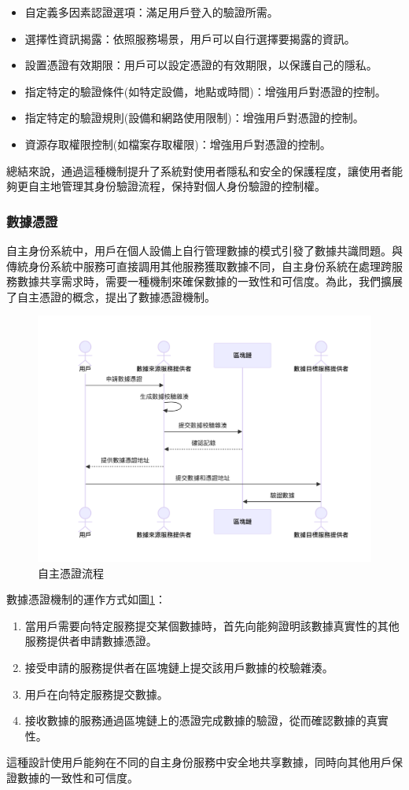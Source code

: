 \begin{itemize}
  \item 自定義多因素認證選項：滿足用戶登入的驗證所需。
  \item 選擇性資訊揭露：依照服務場景，用戶可以自行選擇要揭露的資訊。
  \item 設置憑證有效期限：用戶可以設定憑證的有效期限，以保護自己的隱私。
  \item 指定特定的驗證條件(如特定設備，地點或時間)：增強用戶對憑證的控制。
  \item 指定特定的驗證規則(設備和網路使用限制)：增強用戶對憑證的控制。
  \item 資源存取權限控制(如檔案存取權限)：增強用戶對憑證的控制。
\end{itemize}

總結來說，通過這種機制提升了系統對使用者隱私和安全的保護程度，讓使用者能夠更自主地管理其身份驗證流程，保持對個人身份驗證的控制權。
\subsubsection{數據憑證}
自主身份系統中，用戶在個人設備上自行管理數據的模式引發了數據共識問題。與傳統身份系統中服務可直接調用其他服務獲取數據不同，自主身份系統在處理跨服務數據共享需求時，需要一種機制來確保數據的一致性和可信度。為此，我們擴展了自主憑證的概念，提出了數據憑證機制。
\begin{figure}
  \centering
  \includegraphics[width=\linewidth,keepaspectratio]{figures/flow-dc.png}
  \caption{自主憑證流程}
  \label{fig:flow-dc}
\end{figure}
數據憑證機制的運作方式如圖\ref{fig:flow-dc}：
\begin{enumerate}
  \item 當用戶需要向特定服務提交某個數據時，首先向能夠證明該數據真實性的其他服務提供者申請數據憑證。
  \item 接受申請的服務提供者在區塊鏈上提交該用戶數據的校驗雜湊。
  \item 用戶在向特定服務提交數據。
  \item 接收數據的服務通過區塊鏈上的憑證完成數據的驗證，從而確認數據的真實性。
\end{enumerate}
這種設計使用戶能夠在不同的自主身份服務中安全地共享數據，同時向其他用戶保證數據的一致性和可信度。

